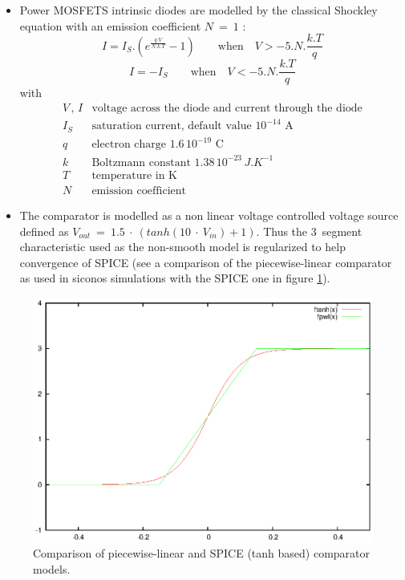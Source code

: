 \documentclass{article}
\begin{document}
\begin{itemize}
\item Power MOSFETS intrinsic diodes are modelled by the classical Shockley equation with an emission
coefficient $N~=~1$ :
\[ I = I_S.({e^{\frac{q.V}{N.k.T}} - 1}) \qquad \textrm{when} \quad V > -5.N.\frac{k.T}{q} \]
\[ I = -I_S \qquad  \textrm{when} \quad V < -5.N.\frac{k.T}{q} \]
with
\[
\begin{array}{ll}
V\,,\,I & \textrm{voltage across the diode and current through the diode}\\
I_S & \textrm{saturation current, default value $10^{-14}$~A}\\
q & \textrm{electron charge $1.6\,10^{-19}$~C}\\
k & \textrm{Boltzmann constant $1.38\,10^{-23}\,J.K^{-1}$}\\
T & \textrm{temperature in K}\\
N & \textrm{emission coefficient}
\end{array}
\]
\item The comparator is modelled as a non linear voltage controlled voltage source defined as $V_{out}~=~1.5~\cdot~(tanh(10~\cdot~V_{in}) + 1)$. Thus the 3~segment characteristic used as the non-smooth model is regularized to help convergence of SPICE
(see a comparison of the piecewise-linear comparator as used in {\sc siconos} simulations with the SPICE one in figure \ref{fig-comparator-models}).
\end{itemize}

\begin{figure}[hbtp]
\begin{center}
\includegraphics[scale=0.6,angle=0]{./figure/comparators.eps}
\end{center}
\caption{Comparison of piecewise-linear and SPICE (tanh based) comparator models.}
\label{fig-comparator-models}
\end{figure}
\end{document}
